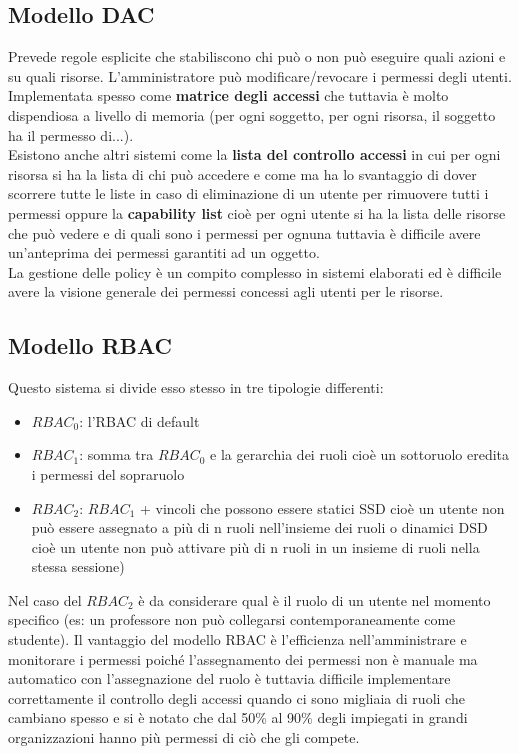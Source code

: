 \subsection{Modello DAC}
Prevede regole esplicite che stabiliscono chi può o non può eseguire quali azioni e su quali risorse.
L'amministratore può modificare/revocare i permessi degli utenti.
Implementata spesso come \textbf{matrice degli accessi} che tuttavia è molto dispendiosa a livello di memoria (per ogni soggetto, per ogni risorsa, il soggetto ha il permesso di...).\\
Esistono anche altri sistemi come la \textbf{lista del controllo accessi} in cui per ogni risorsa si ha la lista di chi può accedere e come ma ha lo svantaggio di dover scorrere tutte le liste in caso di eliminazione di un utente per rimuovere tutti i permessi oppure la \textbf{capability list} cioè per ogni utente si ha la lista delle risorse che può vedere e di quali sono i permessi per ognuna tuttavia è difficile avere un'anteprima dei permessi garantiti ad un oggetto.\\
La gestione delle policy è un compito complesso in sistemi elaborati ed è difficile avere la visione generale dei permessi concessi agli utenti per le risorse.

\subsection{Modello RBAC}
Questo sistema si divide esso stesso in tre tipologie differenti:
\begin{itemize}[noitemsep]
    \item $RBAC_0$: l'RBAC di default
    \item $RBAC_1$: somma tra $RBAC_0$ e la gerarchia dei ruoli cioè un sottoruolo eredita i permessi del sopraruolo
    \item $RBAC_2$: $RBAC_1$ + vincoli che possono essere statici \acrfull{SSD} cioè un utente non può essere assegnato a più di n ruoli nell'insieme dei ruoli o dinamici \acrfull{DSD} cioè un utente non può attivare più di n ruoli in un insieme di ruoli nella stessa sessione)
\end{itemize}
Nel caso del $RBAC_2$ è da considerare qual è il ruolo di un utente nel momento specifico  (es: un professore non può collegarsi contemporaneamente come studente). Il vantaggio del modello \acrshort{RBAC} è l'efficienza nell'amministrare e monitorare i permessi poiché l'assegnamento dei permessi non è manuale ma automatico con l'assegnazione del ruolo è tuttavia difficile implementare correttamente il controllo degli accessi quando ci sono migliaia di ruoli che cambiano spesso e si è notato che dal 50\% al 90\% degli impiegati in grandi organizzazioni hanno più permessi di ciò che gli compete.

